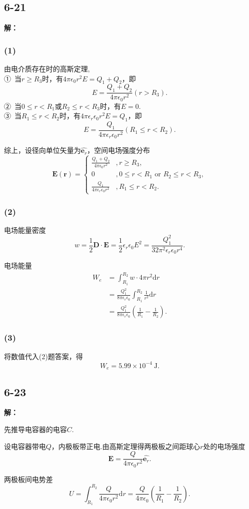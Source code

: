 \documentclass[twocolumn]{ctexart}
\newcommand{\sol}[1]{\subsection*{#1}\noindent\textbf{解：}
	
}
\begin{document}
	\sol{6-21}
	\subsubsection*{(1)}
	由电介质存在时的高斯定理,\\
	①\ 当$r\geq R_3$时，有$4\pi\epsilon_0r^2E=Q_1+Q_2$，即
	$$E=\frac{Q_1+Q_2}{4\pi\epsilon_0r^2}(r>R_3).$$
	②\ 当$0\leq r<R_1$或$R_2\leq r<R_3$时，有$E=0$.\\
	③\ 当$R_1\leq r<R_2$时，有$4\pi\epsilon_r\epsilon_0r^2E=Q_1$，即
	$$E=\frac{Q_1}{4\pi\epsilon_r\epsilon_0r^2}(R_1\leq r<R_2).$$
	
	综上，设径向单位矢量为$\hat{\mathbf{e}_r}$，空间电场强度分布
	$$\mathbf{E}(\mathbf{r})=\left\{\begin{array}{ll}
		\displaystyle{\frac{Q_1+Q_2}{4\pi\epsilon_0r^2}}&,r\geq R_3,\\
		0&,0\leq r<R_1\textrm{\ or\ }R_2\leq r<R_3,\\
		\displaystyle{\frac{Q_1}{4\pi\epsilon_r\epsilon_0r^2}}&,R_1\leq r<R_2.
	\end{array}\right.$$
	\subsubsection*{(2)}
	电场能量密度
	$$w=\frac{1}{2}\mathbf{D}\cdot\mathbf{E}=\frac{1}{2}\epsilon_r\epsilon_0E^2=\frac{Q_1^2}{32\pi^2\epsilon_r\epsilon_0 r^4}.$$
	
	电场能量
	\begin{align*}
		W_e&=\int_{R_1}^{R_2}w\cdot4\pi r^2\mathrm{d}r\\
		&=\frac{Q_1^2}{8\pi\epsilon_r\epsilon_0}\int_{R_1}^{R_2}\frac{1}{r^2}\mathrm{d}r\\
		&=\frac{Q_1^2}{8\pi\epsilon_r\epsilon_0}\left(\frac{1}{R_1}-\frac{1}{R_2}\right).
	\end{align*}
	\subsubsection*{(3)}
	将数值代入(2)题答案，得
	$$W_e=5.99\times10^{-4}\ \mathrm{J}.$$
	
	\sol{6-23}
	先推导电容器的电容$C$.
	
	设电容器带电$Q$，内极板带正电.由高斯定理得两极板之间距球心$r$处的电场强度
	$$\mathbf E=\frac{Q}{4\pi\epsilon_0r^2}\hat{\mathbf e_r}.$$
	
	两极板间电势差
	$$U=\int_{R_1}^{R_2}\frac{Q}{4\pi\epsilon_0r^2}\mathrm{d}r=\frac{Q}{4\pi\epsilon_0}\left(\frac{1}{R_1}-\frac{1}{R_2}\right).$$
	
\end{document}
